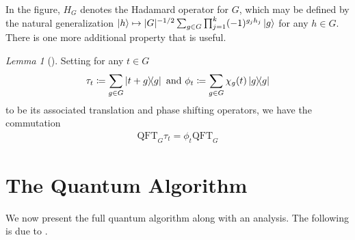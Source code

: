 \documentclass[10pt]{amsart}
\numberwithin{equation}{section}
\theoremstyle{definition}
\theoremstyle{remark}
\newtheorem{lemma}[theorem]{Lemma}
\begin{document}
    \begin{figure}[!hbtp]
        \centering
        \hspace{2cm}
    \end{figure}

    In the figure, \(H_G\) denotes the Hadamard operator for \(G\), which may be defined by the natural generalization \(\ket{h} \mapsto |G|^{-1/2} \sum_{g \in G} \prod_{j=1}^k(-1)^{g_jh_j} \ket{g}\) for any \(h \in G\). There is one more additional property that is useful.

    \begin{lemma}[{\cite[p. 20-21]{Lomont}}] \label{general_quantum_fourier_transform_commutation_property}
        Setting for any \(t \in G\)
        \begin{align}
            \tau_t \coloneqq \sum_{g \in G} \ketbra{t+g}{g} \text{ and } \phi_t \coloneqq \sum_{g \in G} \chi_g(t)\ketbra{g}{g}
        \end{align}
        to be its associated translation and phase shifting operators, we have the commutation
        \begin{align}
            \text{QFT}_G\tau_t = \phi_t\text{QFT}_G
        \end{align}
    \end{lemma}

    \section{The Quantum Algorithm}

    We now present the full quantum algorithm along with an analysis. The following is due to \cite[pp. 22-23]{Lomont}.
\end{document}
